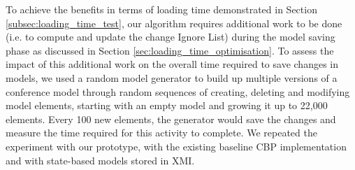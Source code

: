 \documentclass{llncs}
\begin{document}
To achieve the benefits in terms of loading time demonstrated in Section \ref{subsec:loading_time_test}, our algorithm requires additional work to be done (i.e. to compute and update the change Ignore List) during the model saving phase as discussed in Section \ref{sec:loading_time_optimisation}. To assess the impact of this additional work on the overall time required to save changes in models, we used a random model generator to build up multiple versions of a conference model through random sequences of creating, deleting and modifying model elements, starting with an empty model and growing it up to 22,000 elements. Every 100 new elements, the generator would save the changes and measure the time required for this activity to complete. We repeated the experiment with our prototype, with the existing baseline CBP implementation and with state-based models stored in XMI.
\end{document}
